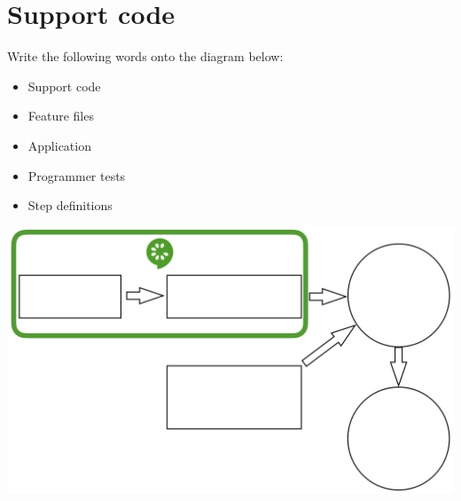 \chapter*{Support code}

\ifnotes

\fi

\ifcontent

    Write the following words onto the diagram below:
    
    \begin{itemize}
        \item Support code
        \item Feature files
        \item Application
        \item Programmer tests
        \item Step definitions
    \end{itemize}

    \includegraphics[width=\textwidth, keepaspectratio]{images/support-code}
    


\fi
